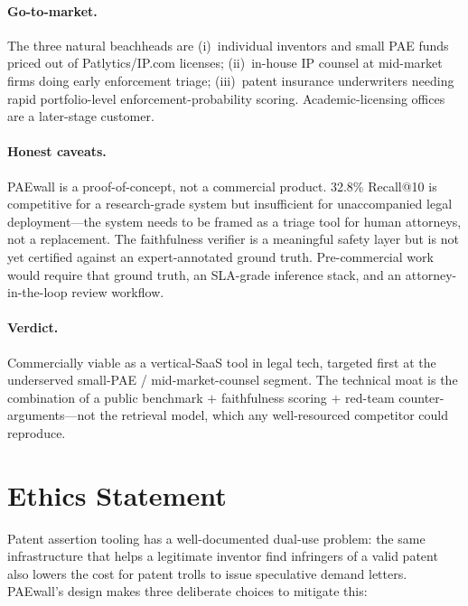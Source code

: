 \documentclass[11pt]{article}
\begin{document}
\paragraph{Go-to-market.} The three natural beachheads are (i)~individual inventors and small PAE funds priced out of Patlytics/IP.com licenses; (ii)~in-house IP counsel at mid-market firms doing early enforcement triage; (iii)~patent insurance underwriters needing rapid portfolio-level enforcement-probability scoring. Academic-licensing offices are a later-stage customer.

\paragraph{Honest caveats.} PAEwall is a proof-of-concept, not a commercial product. 32.8\% Recall@10 is competitive for a research-grade system but insufficient for unaccompanied legal deployment---the system needs to be framed as a triage tool for human attorneys, not a replacement. The faithfulness verifier is a meaningful safety layer but is not yet certified against an expert-annotated ground truth. Pre-commercial work would require that ground truth, an SLA-grade inference stack, and an attorney-in-the-loop review workflow.

\paragraph{Verdict.} Commercially viable as a vertical-SaaS tool in legal tech, targeted first at the underserved small-PAE / mid-market-counsel segment. The technical moat is the combination of a public benchmark $+$ faithfulness scoring $+$ red-team counter-arguments---not the retrieval model, which any well-resourced competitor could reproduce.

\section{Ethics Statement}

Patent assertion tooling has a well-documented dual-use problem: the same infrastructure that helps a legitimate inventor find infringers of a valid patent also lowers the cost for patent trolls to issue speculative demand letters. PAEwall's design makes three deliberate choices to mitigate this:
\end{document}
